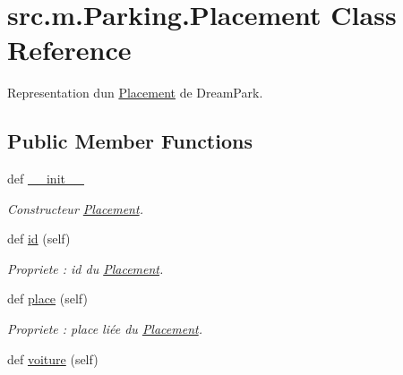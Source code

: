 \hypertarget{classsrc_1_1m_1_1_parking_1_1_placement}{}\section{src.\+m.\+Parking.\+Placement Class Reference}
\label{classsrc_1_1m_1_1_parking_1_1_placement}


Representation d\textquotesingle{}un \hyperlink{classsrc_1_1m_1_1_parking_1_1_placement}{Placement} de Dream\+Park.  


\subsection*{Public Member Functions}
\begin{DoxyCompactItemize}
\item 
def \hyperlink{classsrc_1_1m_1_1_parking_1_1_placement_abcad7906a07478ec982d572c888daad0}{\+\_\+\+\_\+init\+\_\+\+\_\+}
\begin{DoxyCompactList}\small\item\em Constructeur \hyperlink{classsrc_1_1m_1_1_parking_1_1_placement}{Placement}. \end{DoxyCompactList}\item 
\hypertarget{classsrc_1_1m_1_1_parking_1_1_placement_a9b8d3f87ad3405d45822e2c0351f4248}{}def \hyperlink{classsrc_1_1m_1_1_parking_1_1_placement_a9b8d3f87ad3405d45822e2c0351f4248}{id} (self)\label{classsrc_1_1m_1_1_parking_1_1_placement_a9b8d3f87ad3405d45822e2c0351f4248}

\begin{DoxyCompactList}\small\item\em Propriete \+: id du \hyperlink{classsrc_1_1m_1_1_parking_1_1_placement}{Placement}. \end{DoxyCompactList}\item 
\hypertarget{classsrc_1_1m_1_1_parking_1_1_placement_ab20b812c02e985f72ee98a6587a7a0fa}{}def \hyperlink{classsrc_1_1m_1_1_parking_1_1_placement_ab20b812c02e985f72ee98a6587a7a0fa}{place} (self)\label{classsrc_1_1m_1_1_parking_1_1_placement_ab20b812c02e985f72ee98a6587a7a0fa}

\begin{DoxyCompactList}\small\item\em Propriete \+: place liée du \hyperlink{classsrc_1_1m_1_1_parking_1_1_placement}{Placement}. \end{DoxyCompactList}\item 
\hypertarget{classsrc_1_1m_1_1_parking_1_1_placement_a2be5bb714760ffb79d3b401011afac1a}{}def \hyperlink{classsrc_1_1m_1_1_parking_1_1_placement_a2be5bb714760ffb79d3b401011afac1a}{voiture} (self)\label{classsrc_1_1m_1_1_parking_1_1_placement_a2be5bb714760ffb79d3b401011afac1a}


\end{DoxyCompactItemize}
